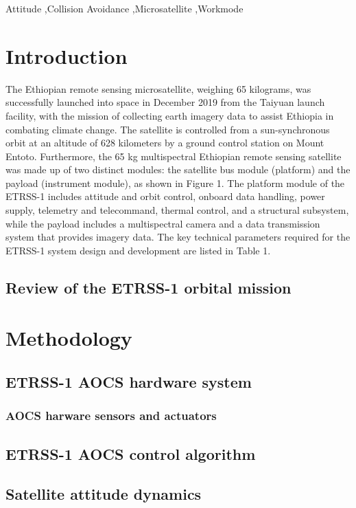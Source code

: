 \documentclass[final,5p,times,twocolumn]{elsarticle}
\begin{document}
\begin{frontmatter}
\begin{keyword}
	Attitude \sep Collision Avoidance \sep Microsatellite \sep  Workmode

\end{keyword}
\end{frontmatter}


\section{Introduction}
\label{}
The Ethiopian remote sensing microsatellite, weighing 65 kilograms, was successfully launched into space  in December 2019 from the Taiyuan launch facility, with the mission of collecting earth imagery data to assist Ethiopia in combating climate change. The satellite is controlled from a sun-synchronous orbit at an altitude of 628 kilometers by a ground control station on Mount Entoto. Furthermore, the 65 kg multispectral Ethiopian remote sensing satellite was made up of two distinct modules: the satellite bus module (platform) and the payload (instrument module), as shown in Figure 1. The platform module of the ETRSS-1 includes attitude and orbit control, onboard data handling, power supply, telemetry and telecommand, thermal control, and a structural subsystem, while the payload includes a multispectral camera and a data transmission system that provides imagery data. The key technical parameters required for the ETRSS-1 system design and development are listed in Table 1.
\subsection{Review of the ETRSS-1 orbital mission }
\section{Methodology}
\subsection{ETRSS-1 AOCS hardware system}
\subsubsection{AOCS harware sensors and actuators}
\subsection{ETRSS-1 AOCS control algorithm}
\subsection{Satellite attitude dynamics}
\end{document}
